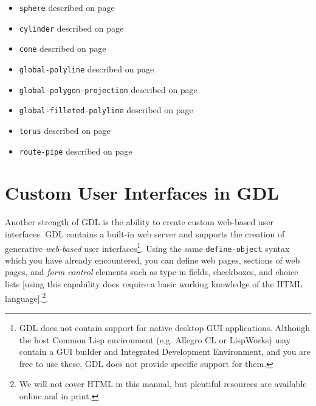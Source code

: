 \documentclass [11pt]{book}
\begin{document}
\begin{itemize}

\item \texttt{sphere} described on page 
\pageref{prim:sphere}

\item \texttt{cylinder} described on page 
\pageref{prim:cylinder}

\item \texttt{cone} described on page 
\pageref{prim:cone}

\item \texttt{global-polyline} described on page 
\pageref{prim:global-polyline}

\item \texttt{global-polygon-projection} described on page 
\pageref{prim:global-polygon-projection}

\item \texttt{global-filleted-polyline} described on page 
\pageref{prim:global-polyline}

\item \texttt{torus} described on page 
\pageref{prim:torus}

\item \texttt{route-pipe} described on page 
\pageref{prim:route-pipe}

\end{itemize}



\chapter{Custom User Interfaces in GDL}

\label{chap:customuserinterfacesingdl}



Another strength of GDL is the ability to create custom
web-based user interfaces. GDL contains a built-in web server and
supports the creation of generative \emph{web-based} user interfaces\footnote{GDL does not contain support for native desktop
GUI applications. Although the host Common Lisp
environment (e.g. Allegro CL or LispWorks) may contain a GUI builder
and Integrated Development Environment, and you are free to use these,
GDL does not provide specific support for them.}. Using the same \texttt{define-object} syntax which you have already encountered, you can define
web pages, sections of web pages, and \emph{form control} elements such as type-in fields, checkboxes, and choice
lists [using this capability does require a basic working knowledge of
the HTML language].\footnote{We will not cover HTML in this manual, but
plentiful resources are available online and in print.}.
\end{document}
